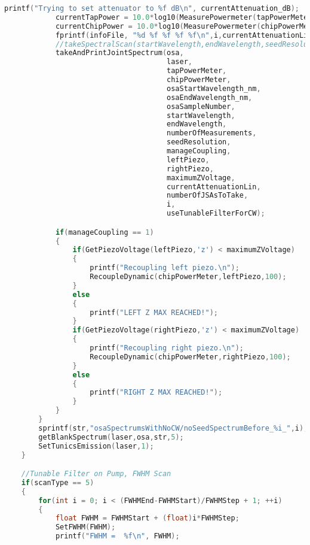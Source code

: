 \begin{lstlisting}[style=customc, language=C]
            printf("Trying to set attenuator to %f dB\n", currentAttenuation_dB);
            currentTapPower = 10.0*log10(MeasurePowermeter(tapPowerMeter))  + 30 + TapPowermeterAttenuation;
            currentChipPower = 10.0*log10(MeasurePowermeter(chipPowerMeter))  + 30 + ChipPowermeterAttenuation;
            fprintf(infoFile, "%d %f %f %f %f\n",i,currentAttenuationLin,currentAttenuation_dB,currentTapPower,currentChipPower);
            //takeSpectralScan(startWavelength,endWavelength,seedResolution,currentAttenuation_dB,chipPowerMeter,tapPowerMeter,laser);
            takeAndPrintJointSpectrum(osa,
                                      laser,
                                      tapPowerMeter,
                                      chipPowerMeter,
                                      osaStartWavelength_nm,
                                      osaEndWavelength_nm,
                                      osaSampleNumber,
                                      startWavelength,
                                      endWavelength,
                                      numberOfMeasurements,
                                      seedResolution,
                                      manageCoupling,
                                      leftPiezo,
                                      rightPiezo,
                                      maximumZVoltage,
                                      currentAttenuationLin,
                                      numberOfJSAsToTake,
                                      i,
                                      useTunableFilterForCW);

            if(manageCoupling == 1)
            {
                if(GetPiezoVoltage(leftPiezo,'z') < maximumZVoltage)
                {
                    printf("Recoupling left piezo.\n");
                    RecoupleDynamic(chipPowerMeter,leftPiezo,100);
                }
                else
                {
                    printf("LEFT Z MAX REACHED!");
                }
                if(GetPiezoVoltage(rightPiezo,'z') < maximumZVoltage)
                {
                    printf("Recoupling right piezo.\n");
                    RecoupleDynamic(chipPowerMeter,rightPiezo,100);
                }
                else
                {
                    printf("RIGHT Z MAX REACHED!");
                }
            }
        }
        sprintf(str,"osaSpectrumsWithNoCW/noSeedSpectrumBefore_%i_",i);
        getBlankSpectrum(laser,osa,str,5);
        SetTunicsEmission(laser,1);
    }

    //Tunable Filter on Pump, FWHM Scan
    if(scanType == 5)
    {
        for(int i = 0; i < (FWHMEnd-FWHMStart)/FWHMStep + 1; ++i)
        {
            float FWHM = FWHMStart + (float)i*FWHMStep;
            SetFWHM(FWHM);
            printf("FWHM =  %f\n", FWHM);


\end{lstlisting}
